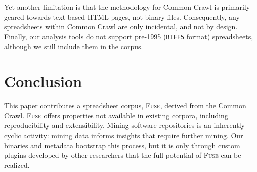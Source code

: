 \documentclass[conference]{IEEEtran}
\begin{document}
Yet another limitation is that the methodology for Common Crawl is primarily geared towards text-based HTML pages, not binary files. Consequently, any spreadsheets within Common Crawl are only incidental, and not by design. Finally, our analysis tools do not support pre-1995 (\texttt{BIFF5} format) spreadsheets, although we still include them in the corpus.







\section{Conclusion}

This paper contributes a spreadsheet corpus, \textsc{Fuse}, derived from the Common Crawl. \textsc{Fuse} offers properties not available in existing corpora, including reproducibility and extensibility. Mining software repositories is an inherently cyclic activity: mining data informs insights that require further mining. Our binaries and metadata bootstrap this process, but it is only through custom plugins developed by other researchers that the full potential of \textsc{Fuse} can be realized.
\end{document}
